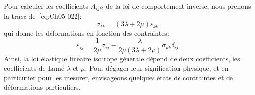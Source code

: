 Pour calculer les coefficients $A_{ijkl}$ de la loi de comportement inverse, nous prenons la trace de~\eqref{eq:Ch05-022}:
\begin{equation}
    \sigma_{kk} = \left( 3 \lambda + 2\mu \right) \varepsilon_{kk}
    \label{eq:Ch05-026}
\end{equation}
qui donne les déformations en fonction des contraintes: 
\begin{equation}
    \varepsilon_{ij} = \frac{1}{2\mu} \sigma_{ij} - \frac{\lambda}{2\mu \left( 3\lambda + 2 \mu \right)}\sigma_{kk} \delta_{ij}
    \label{eq:Ch05-027}
\end{equation}
Ainsi, la loi élastique linéaire isotrope générale dépend de deux coefficients, les coefficients de Lamé $\lambda$ et $\mu$.
Pour dégager leur signification physique, et en particutier pour les mesurer, envisageons quelques états de contraintes et de déformations particuliers.
